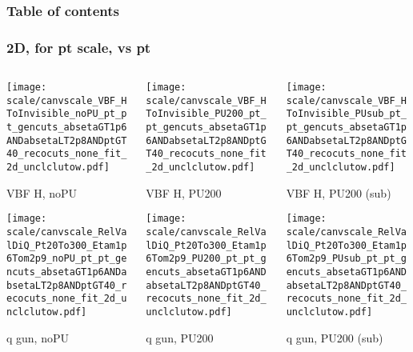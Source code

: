 \documentclass[8pt]{beamer}
\begin{document}
\begin{frame}
 \frametitle{Table of contents}
 
\end{frame}

 \begin{frame}
  \frametitle{2D, for pt scale, vs pt}
  
  \begin{columns}
   \begin{column}{0.35\textwidth}
     \texttt{[image: scale/canvscale\_VBF\_HToInvisible\_noPU\_pt\_pt\_gencuts\_absetaGT1p6ANDabsetaLT2p8ANDptGT40\_recocuts\_none\_fit\_2d\_unclclutow.pdf]}
     
     VBF H, noPU
    
     \texttt{[image: scale/canvscale\_RelValDiQ\_Pt20To300\_Etam1p6Tom2p9\_noPU\_pt\_pt\_gencuts\_absetaGT1p6ANDabsetaLT2p8ANDptGT40\_recocuts\_none\_fit\_2d\_unclclutow.pdf]}
     
     q gun, noPU
   \end{column}
   \begin{column}{0.35\textwidth}
     \texttt{[image: scale/canvscale\_VBF\_HToInvisible\_PU200\_pt\_pt\_gencuts\_absetaGT1p6ANDabsetaLT2p8ANDptGT40\_recocuts\_none\_fit\_2d\_unclclutow.pdf]}
     
     VBF H, PU200
    
     \texttt{[image: scale/canvscale\_RelValDiQ\_Pt20To300\_Etam1p6Tom2p9\_PU200\_pt\_pt\_gencuts\_absetaGT1p6ANDabsetaLT2p8ANDptGT40\_recocuts\_none\_fit\_2d\_unclclutow.pdf]}
     
     q gun, PU200
   \end{column}
   \begin{column}{0.35\textwidth}
     \texttt{[image: scale/canvscale\_VBF\_HToInvisible\_PUsub\_pt\_pt\_gencuts\_absetaGT1p6ANDabsetaLT2p8ANDptGT40\_recocuts\_none\_fit\_2d\_unclclutow.pdf]}
     
     VBF H, PU200 (sub)
    
     \texttt{[image: scale/canvscale\_RelValDiQ\_Pt20To300\_Etam1p6Tom2p9\_PUsub\_pt\_pt\_gencuts\_absetaGT1p6ANDabsetaLT2p8ANDptGT40\_recocuts\_none\_fit\_2d\_unclclutow.pdf]}
     
     q gun, PU200 (sub)
   \end{column}
  \end{columns}
 \end{frame}
 
\end{document}
